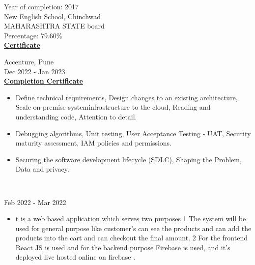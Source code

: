 \documentclass[letterpaper,10pt]{memoir} %
\begin{document}

{Year of completion: 2017}\\
{New English School, Chinchwad}\\
{MAHARASHTRA STATE board}\\
Percentage: 79.60\% \\
\textbf{\href{https://drive.google.com/file/d/1IxFursjJ43UGFS6yXX_HcLk-hw1T04D8/view}{Certificate}}\\



{Accenture, Pune}\\
{Dec 2022 - Jan 2023}\\
\textbf{\href{https://drive.google.com/file/d/1JDvsoCqJDaUUDvKgyLSU5DUn6cQJlzQp/view}{Completion Certificate}}
\begin{itemize}
	\item Define technical requirements, Design changes to an existing architecture, Scale on-premise systeminfrastructure to the cloud, Reading and understanding code, Attention to detail.

	\item Debugging algorithms, Unit testing, User Acceptance Testing - UAT, Security maturity assessment, IAM policies and permissions.

	\item Securing the software development lifecycle (SDLC), Shaping the Problem, Data and privacy.\\
\end{itemize}\\




{Feb 2022 - Mar 2022}\\
\begin{itemize}
    \item t is a web based application which serves two purposes 1 The system will be used for general purpose like customer's can see the products and can add the products into the cart and can checkout the final amount. 2 For the frontend React JS is used and for the backend purpose Firebase is used, and it’s deployed live hosted online on firebase .\\
\end{itemize}
\clearpage %
\end{document}
